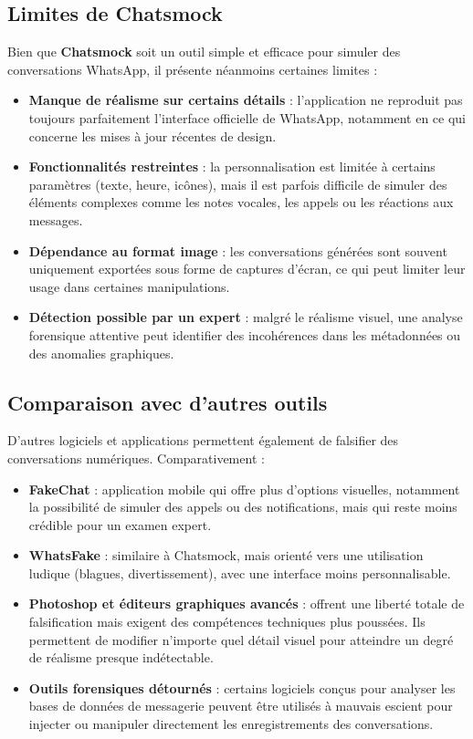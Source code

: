 \documentclass[12pt, a4paper]{article}
\begin{document}
\subsection{Limites de Chatsmock}
Bien que \textbf{Chatsmock} soit un outil simple et efficace pour simuler des conversations WhatsApp, il présente néanmoins certaines limites :  
\begin{itemize}
	\item \textbf{Manque de réalisme sur certains détails} : l’application ne reproduit pas toujours parfaitement l’interface officielle de WhatsApp, notamment en ce qui concerne les mises à jour récentes de design.  
	\item \textbf{Fonctionnalités restreintes} : la personnalisation est limitée à certains paramètres (texte, heure, icônes), mais il est parfois difficile de simuler des éléments complexes comme les notes vocales, les appels ou les réactions aux messages.  
	\item \textbf{Dépendance au format image} : les conversations générées sont souvent uniquement exportées sous forme de captures d’écran, ce qui peut limiter leur usage dans certaines manipulations.  
	\item \textbf{Détection possible par un expert} : malgré le réalisme visuel, une analyse forensique attentive peut identifier des incohérences dans les métadonnées ou des anomalies graphiques.  
\end{itemize}

\subsection{Comparaison avec d’autres outils}
D’autres logiciels et applications permettent également de falsifier des conversations numériques. Comparativement :  
\begin{itemize}
	\item \textbf{FakeChat} : application mobile qui offre plus d’options visuelles, notamment la possibilité de simuler des appels ou des notifications, mais qui reste moins crédible pour un examen expert.  
	\item \textbf{WhatsFake} : similaire à Chatsmock, mais orienté vers une utilisation ludique (blagues, divertissement), avec une interface moins personnalisable.  
	\item \textbf{Photoshop et éditeurs graphiques avancés} : offrent une liberté totale de falsification mais exigent des compétences techniques plus poussées. Ils permettent de modifier n’importe quel détail visuel pour atteindre un degré de réalisme presque indétectable.  
	\item \textbf{Outils forensiques détournés} : certains logiciels conçus pour analyser les bases de données de messagerie peuvent être utilisés à mauvais escient pour injecter ou manipuler directement les enregistrements des conversations.  
\end{itemize}
\end{document}
